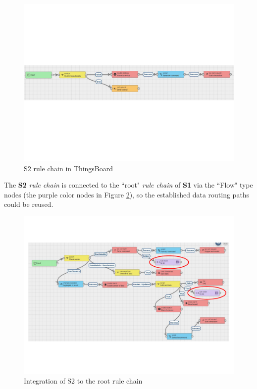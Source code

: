 \begin{figure}[hbt!]
  \centering
  \includegraphics[scale=0.55]{figures/s2_tb_rulechain.pdf}
  \caption{S2 rule chain in ThingsBoard}
  \label{fig:s2_tb_rulechain}
\end{figure}

The \textbf{S2} \textit{rule chain} is connected to the ``root" \textit{rule chain} of \textbf{S1} via the ``Flow" type nodes (the purple color nodes in Figure \ref{fig:s2_tb_rulechain_root}), so the established data routing paths could be reused.

\begin{figure}[hbt!]
  \centering
  \includegraphics[scale=0.5]{figures/s2_tb_rulechain_root.pdf}
  \caption{Integration of S2 to the root rule chain}
  \label{fig:s2_tb_rulechain_root}
\end{figure}

